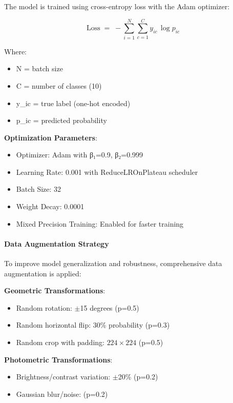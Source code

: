 \documentclass[11pt,a4paper,twoside]{article}
\providecommand{\tightlist}{%
  \setlength{\itemsep}{0pt}\setlength{\parskip}{0pt}}
\begin{document}
The model is trained using cross-entropy loss with the Adam optimizer:

\[
\text{Loss} \;=\; -\sum_{i=1}^{N}\sum_{c=1}^{C} y_{ic}\,\log p_{ic}
\]

Where:

\begin{itemize}
\tightlist
\item
  N = batch size
\item
  C = number of classes (10)
\item
  y\_ic = true label (one-hot encoded)
\item
  p\_ic = predicted probability
\end{itemize}

\textbf{Optimization Parameters}:

\begin{itemize}
\tightlist
\item
  Optimizer: Adam with β₁=0.9, β₂=0.999
\item
  Learning Rate: 0.001 with ReduceLROnPlateau scheduler
\item
  Batch Size: 32
\item
  Weight Decay: 0.0001
\item
  Mixed Precision Training: Enabled for faster training
\end{itemize}

\paragraph{Data Augmentation
Strategy}\label{data-augmentation-strategy}

To improve model generalization and robustness, comprehensive data
augmentation is applied:

\textbf{Geometric Transformations}:

\begin{itemize}
\tightlist
\item Random rotation: $\pm$15 degrees (p=0.5)
\item Random horizontal flip: 30\% probability (p=0.3)
\item Random crop with padding: $224\times224$ (p=0.5)
\end{itemize}

\textbf{Photometric Transformations}:

\begin{itemize}
\tightlist
\item Brightness/contrast variation: $\pm$20\% (p=0.2)
\item Gaussian blur/noise: (p=0.2)
\end{itemize}
\end{document}
